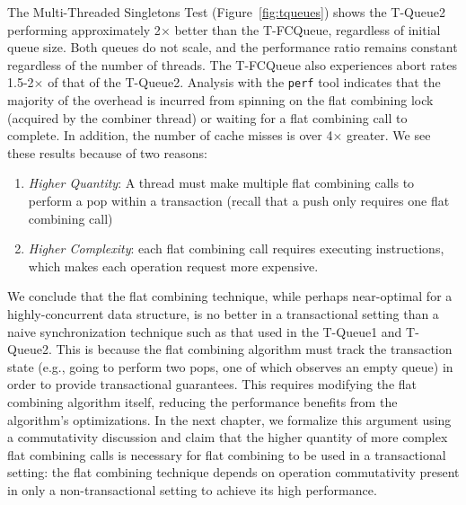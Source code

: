 The Multi-Threaded Singletons Test (Figure~\ref{fig:tqueues}) shows the T-Queue2 performing approximately 2$\times$ better than the T-FCQueue, regardless of initial queue size. Both queues do not scale, and the performance ratio remains constant regardless of the number of threads. The T-FCQueue also experiences abort rates 1.5-2$\times$ of that of the T-Queue2.
Analysis with the \texttt{perf} tool indicates that the majority of the overhead is incurred from spinning on the flat combining lock (acquired by the combiner thread) or waiting for a flat combining call to complete. In addition, the number of cache misses is over 4$\times$ greater. We see these results because of two reasons:
\begin{enumerate}
\item \emph{Higher Quantity}: A thread must make multiple flat combining calls to perform a pop within a transaction (recall that a push only requires one flat combining call) 
\item \emph{Higher Complexity}: each flat combining call requires executing instructions, which makes each operation request more expensive.
\end{enumerate}

We conclude that the flat combining technique, while perhaps near-optimal for a highly-concurrent data structure, is no better in a transactional setting than a naive synchronization technique such as that used in the T-Queue1 and T-Queue2. This is because the flat combining algorithm must track the transaction state (e.g., going to perform two pops, one of which observes an empty queue) in order to provide transactional guarantees. This requires modifying the flat combining algorithm itself, reducing the performance benefits from the algorithm's optimizations. In the next chapter, we formalize this argument using a commutativity discussion and claim that the higher quantity of more complex flat combining calls is necessary for flat combining to be used in a transactional setting: the flat combining technique depends on operation commutativity present in only a non-transactional setting to achieve its high performance. 
